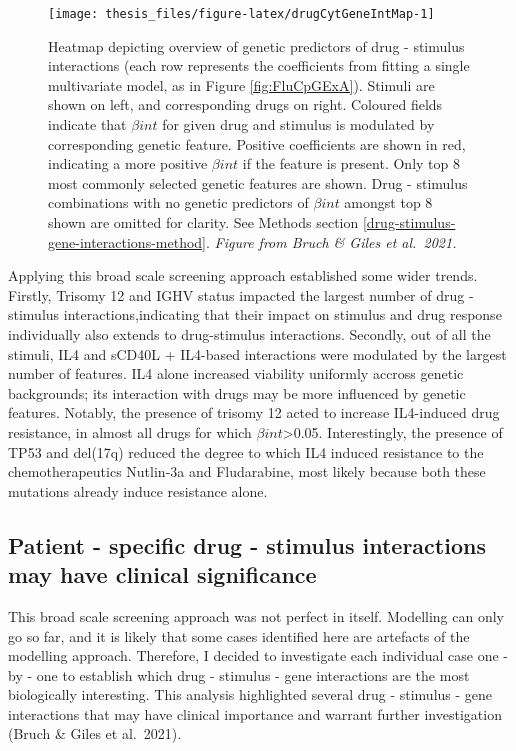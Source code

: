 \documentclass[11pt, a4paper, twosided]{book}
\begin{document}
\begin{figure}

{\centering \texttt{[image: thesis\_files/figure-latex/drugCytGeneIntMap-1]} 

}

\caption{Heatmap depicting overview of genetic predictors of drug - stimulus interactions (each row represents the coefficients from fitting a single multivariate model, as in Figure \ref{fig:FluCpGExA}). Stimuli are shown on left, and corresponding drugs on right. Coloured fields indicate that \(\beta{int}\) for given drug and stimulus is modulated by corresponding genetic feature. Positive coefficients are shown in red, indicating a more positive \(\beta{int}\) if the feature is present. Only top 8 most commonly selected genetic features are shown. Drug - stimulus combinations with no genetic predictors of \(\beta{int}\) amongst top 8 shown are omitted for clarity. See Methods section \ref{drug-stimulus-gene-interactions-method}. \emph{Figure from Bruch \& Giles et al.~2021.}}\label{fig:drugCytGeneIntMap}
\end{figure}
Applying this broad scale screening approach established some wider trends. Firstly, Trisomy 12 and IGHV status impacted the largest number of drug - stimulus interactions,indicating that their impact on stimulus and drug response individually also extends to drug-stimulus interactions. Secondly, out of all the stimuli, IL4 and sCD40L + IL4-based interactions were modulated by the largest number of features. IL4 alone increased viability uniformly accross genetic backgrounds; its interaction with drugs may be more influenced by genetic features. Notably, the presence of trisomy 12 acted to increase IL4-induced drug resistance, in almost all drugs for which \(\beta{int}\)\textgreater0.05. Interestingly, the presence of TP53 and del(17q) reduced the degree to which IL4 induced resistance to the chemotherapeutics Nutlin-3a and Fludarabine, most likely because both these mutations already induce resistance alone.

\hypertarget{patient---specific-drug---stimulus-interactions-may-have-clinical-significance}{%
\subsection{Patient - specific drug - stimulus interactions may have clinical significance}\label{patient---specific-drug---stimulus-interactions-may-have-clinical-significance}}

This broad scale screening approach was not perfect in itself. Modelling can only go so far, and it is likely that some cases identified here are artefacts of the modelling approach. Therefore, I decided to investigate each individual case one - by - one to establish which drug - stimulus - gene interactions are the most biologically interesting. This analysis highlighted several drug - stimulus - gene interactions that may have clinical importance and warrant further investigation (Bruch \& Giles et al.~2021).
\end{document}
